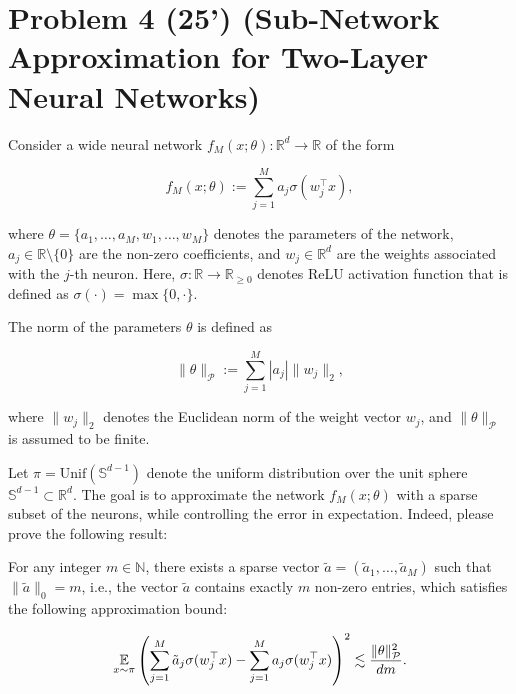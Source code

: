 \section*{Problem 4 (25') (Sub-Network Approximation for Two-Layer Neural Networks)} 


\begin{definition}
    Consider a wide neural network $f_M(x; \theta):\mathbb{R}^{d}\rightarrow\mathbb{R}$ of the form

\[
f_M(x; \theta) := \sum_{j=1}^M a_j \sigma(w_j^{\top} x),
\]

where \( \theta = \{a_1, \dots, a_M, w_1, \dots, w_M\} \) denotes the parameters of the network, \( a_j \in \mathbb{R}\setminus\{0\} \) are the non-zero coefficients, and \( w_j \in \mathbb{R}^d \) are the weights associated with the \( j \)-th neuron. Here, \( \sigma:\mathbb{R}\rightarrow\mathbb{R}_{\geq 0} \) denotes ReLU activation function that is defined as $\sigma(\cdot) = \operatorname{max}\{0, \cdot\}$.
\end{definition}

\begin{definition}
    The norm of the parameters \( \theta \) is defined as

\[
\|\theta\|_{\mathcal{P}} := \sum_{j=1}^M |a_j| \|w_j\|_2,
\]

where \( \|w_j\|_2 \) denotes the Euclidean norm of the weight vector \( w_j \), and \( \|\theta\|_{\mathcal{P}} \) is assumed to be finite.
\end{definition}
 

Let \( \pi = \mathrm{Unif}(\mathbb{S}^{d-1}) \) denote the uniform distribution over the unit sphere \( \mathbb{S}^{d-1} \subset \mathbb{R}^d \). The goal is to approximate the network \( f_M(x; \theta) \) with a sparse subset of the neurons, while controlling the error in expectation. Indeed, please prove the following result:

\begin{theorem}
    For any integer \( m \in \mathbb{N} \), there exists a sparse vector \( \tilde{a} = (\tilde{a}_1, \dots, \tilde{a}_M) \) such that \( \|\tilde{a}\|_0 = m \), i.e., the vector \( \tilde{a} \) contains exactly \( m \) non-zero entries, which satisfies the following approximation bound:

\[
\operatorname*{\mathbb{E}}_{x \sim \pi} \left( \sum_{j=1}^M \tilde{a}_j \sigma(w_j^{\top} x) - \sum_{j=1}^M a_j \sigma(w_j^{\top} x) \right)^2 \lesssim \frac{\|\theta\|_{\mathcal{P}}^2}{dm}.
\]
\end{theorem}


